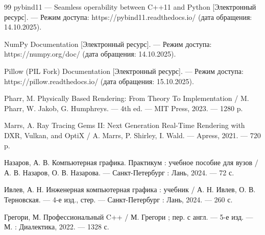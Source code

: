 \begin{thebibliography}{99}
    pybind11 — Seamless operability between C++11 and Python [Электронный ресурс]. — Режим доступа: https://pybind11.readthedocs.io/ (дата обращения: 14.10.2025).
    
    NumPy Documentation [Электронный ресурс]. — Режим доступа: https://numpy.org/doc/ (дата обращения: 14.10.2025).
    
    Pillow (PIL Fork) Documentation [Электронный ресурс]. — Режим доступа: https://pillow.readthedocs.io/ (дата обращения: 15.10.2025).
    
    Pharr, M. Physically Based Rendering: From Theory To Implementation / M. Pharr, W. Jakob, G. Humphreys. — 4th ed. — MIT Press, 2023. — 1280 p.
    
    Marrs, A. Ray Tracing Gems II: Next Generation Real-Time Rendering with DXR, Vulkan, and OptiX / A. Marrs, P. Shirley, I. Wald. — Apress, 2021. — 720 p.
    
    Назаров, А. В. Компьютерная графика. Практикум : учебное пособие для вузов / А. В. Назаров, О. В. Назарова. — Санкт-Петербург : Лань, 2024. — 72 с.
    
    Ивлев, А. Н. Инженерная компьютерная графика : учебник / А. Н. Ивлев, О. В. Терновская. — 4-е изд., стер. — Санкт-Петербург : Лань, 2024. — 260 с.
    
    Грегори, М. Профессиональный C++ / М. Грегори ; пер. с англ. — 5-е изд. — М. : Диалектика, 2022. — 1328 с.
    
\end{thebibliography}